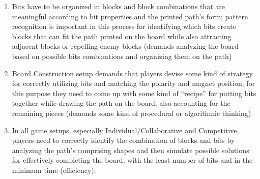 \documentclass{acm_proc_article-sp}
\begin{document}
\begin{enumerate}
\item{Bits have to be organized in blocks and block combinations that are meaningful according to bit properties and the printed path's form; pattern recognition is important in this process for identifying which bits create blocks that can fit the path printed on the board while also attracting adjacent blocks or repelling enemy blocks (demands analyzing the board based on possible bits combinations and organizing them on the path)}
\item{Board Construction setup demands that players devise some kind of strategy for correctly utilizing bits and matching the polarity and magnet position; for this purpose they need to come up with some kind of ``recipe'' for putting bits together while drawing the path on the board, also accounting for the remaining pieces (demands some kind of procedural or algorithmic thinking)}
\item{In all game setups, especially Individual/Collaborative and Competitive, players need to correctly identify the combination of blocks and bits by analyzing the path's comprising shapes and then simulate possible solutions for effectively completing the board, with the least number of bits and in the minimum time (efficiency).}
\end{enumerate}
\end{document}
